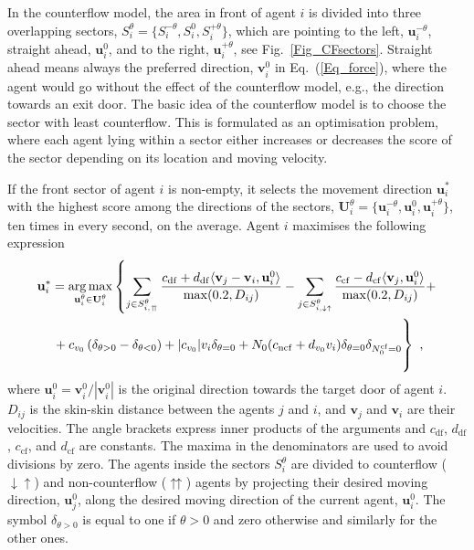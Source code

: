 \documentclass[12pt,a4paper,final,twoside]{stylevk}
\begin{document}
In the counterflow model, the area in front of agent $i$ is divided
into three overlapping sectors, $S^{\theta}_i = \lbrace S^{-\theta}_i
, S^{0}_i , S^{+\theta}_i \rbrace$, which are pointing to the left,
$\mathbf{u}^{-\theta}_i$, straight ahead, $\mathbf{u}^{0}_i$, and to
the right, $\mathbf{u}^{+\theta}_i$, see
Fig.~\ref{Fig_CFsectors}.  Straight ahead means always the
preferred direction, $\mathbf{v}_i^0$ in Eq.~(\ref{Eq_force}), where
the agent would go without the effect of the counterflow model, e.g.,
the direction towards an exit door.  The basic idea of the counterflow
model is to choose the sector with least counterflow.  This is
formulated as an optimisation problem, where each agent lying within a
sector either increases or decreases the score of the sector depending
on its location and moving velocity.


If the front sector of agent $i$ is non-empty, it selects the movement
direction $\mathbf{u}^*_i$ with the highest score among the directions
of the sectors, $\mathbf{U}^\theta_i = \lbrace \mathbf{u}^{-\theta}_i
, \mathbf{u}^{0}_i, \mathbf{u}^{+\theta}_i \rbrace$, ten times in every
second, on the average.  Agent $i$ maximises the following expression
%
\begin{multline}\label{Eq_CF}
  \mathbf{u}^*_i  =  \underset{\mathbf{u}^\theta_i \in
  \mathbf{U}^\theta_i} {\arg\max} \left\lbrace \sum_{j \in
  S^\theta_{i,\upuparrows}} \frac{ c_\mathrm{df}  + d_\mathrm{df}
  \langle \mathbf{v}_j - \mathbf{v}_i , \mathbf{u}^0_i \rangle
  }{\max(0.2, D_{ij})} - \sum_{j \in S^\theta_{i,\downarrow\uparrow}}
  \frac{ c_\mathrm{cf}  - d_\mathrm{cf}  \langle \mathbf{v}_j ,
  \mathbf{u}^0_i \rangle }{\max(0.2, D_{ij})} + \right. \\
  \left.  \vphantom{ \sum_{j \in
  S^\theta_{i,\upuparrows}} \frac{ c_\mathrm{df}  + d_\mathrm{df}
  \langle \mathbf{v}_j - \mathbf{v}_i , \mathbf{u}^0_i \rangle
  }{\max(0.2, D_{ij})} }
  + c_{v_0} \left( \delta_{\theta > 0}  - \delta_{\theta < 0}
  \right) + \vert c_{v_0} \vert v_i  \delta_{\theta = 0} + N_0 (
  c_\mathrm{ncf} + d_{v_0} v_i )\delta_{\theta =
  0}\delta_{N^\mathrm{cf}_0 = 0}  \right\rbrace   ~,
\end{multline}
%
where $\mathbf{u}^0_i = \mathbf{v}^0_i / |\mathbf{v}^0_i|$ is the
original direction towards the target door of agent $i$.  $D_{ij}$ is
the skin-skin distance between the agents $j$ and $i$, and
$\mathbf{v}_j$ and $\mathbf{v}_i$ are their velocities.  The angle
brackets express inner products of the arguments and $c_\mathrm{df}$,
$d_\mathrm{df}$, $c_\mathrm{cf}$, and $d_\mathrm{cf}$ are constants.
The maxima in the denominators are used to avoid divisions by zero.
The agents inside the sectors $S^\theta_i$ are divided to counterflow
($\downarrow\uparrow$) and non-counterflow ($\upuparrows$) agents by
projecting their desired moving direction, $\mathbf{u}^0_j$, along the
desired moving direction of the current agent, $\mathbf{u}^0_i$.  The
symbol $\delta_{\theta > 0}$ is equal to one if $\theta > 0$ and zero
otherwise and similarly for the other ones.
\end{document}
